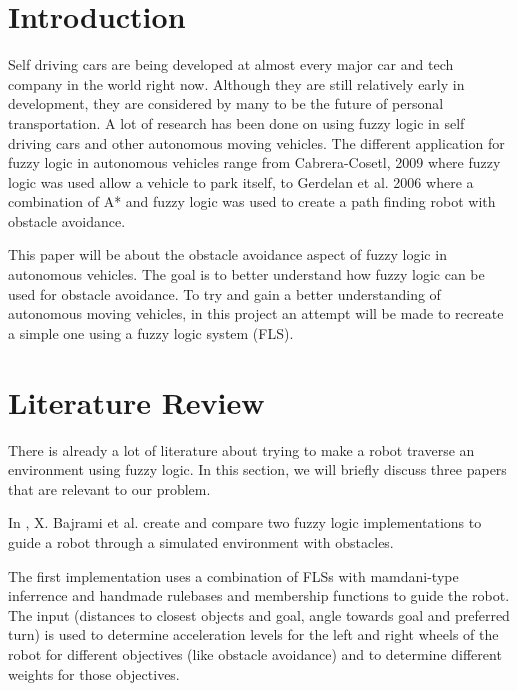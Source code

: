 \documentclass[conference]{IEEEtran}
\begin{document}
\section{Introduction}
Self driving cars are being developed at almost every major car and tech company in the world right now. Although they are still relatively early in development, they are considered by many to be the future of personal transportation. A lot of research has been done on using fuzzy logic in self driving cars and other autonomous moving vehicles. The different application for fuzzy logic in autonomous vehicles range from Cabrera-Cosetl, 2009 \cite{Cabrera2009} where fuzzy logic was used allow a vehicle to park itself, to Gerdelan et al. 2006 \cite{gerdelan2006novel} where a combination of A* and fuzzy logic was used to create a path finding robot with obstacle avoidance.

This paper will be about the obstacle avoidance aspect of fuzzy logic in autonomous vehicles. The goal is to better understand how fuzzy logic can be used for obstacle avoidance. To try and gain a better understanding of autonomous moving vehicles, in this project an attempt will be made to recreate a simple one using a fuzzy logic system (FLS).

\section{Literature Review}
There is already a lot of literature about trying to make a robot traverse an environment using fuzzy logic. In this section, we will briefly discuss three papers that are relevant to our problem.

In \cite{bajrami2015artificial}, X. Bajrami et al. create and compare two fuzzy logic implementations to guide a robot through a simulated environment with obstacles.

The first implementation uses a combination of FLSs with mamdani-type inferrence and handmade rulebases and membership functions to guide the robot. The input (distances to closest objects and goal, angle towards goal and preferred turn) is used to determine acceleration levels for the left and right wheels of the robot for different objectives (like obstacle avoidance) and to determine different weights for those objectives.
\end{document}
